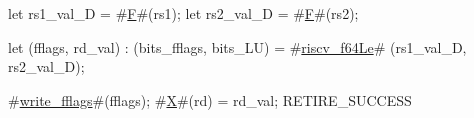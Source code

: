let rs1_val_D = #\hyperref[sailRISCVzF]{F}#(rs1);
let rs2_val_D = #\hyperref[sailRISCVzF]{F}#(rs2);

let (fflags, rd_val) : (bits_fflags, bits_LU) =
    #\hyperref[sailRISCVzriscvzyf64Le]{riscv\_f64Le}# (rs1_val_D, rs2_val_D);

#\hyperref[sailRISCVzwritezyfflags]{write\_fflags}#(fflags);
#\hyperref[sailRISCVzX]{X}#(rd) = rd_val;
RETIRE_SUCCESS
